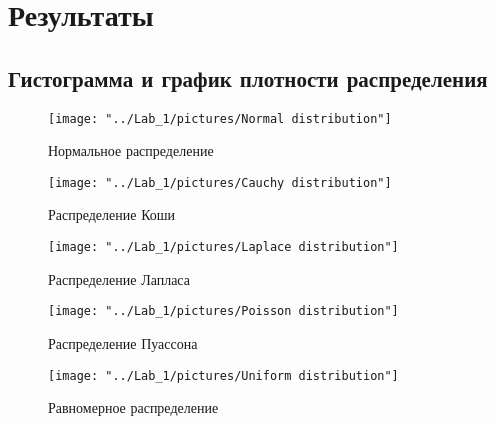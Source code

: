 \documentclass[12pt,a4paper]{article}
\begin{document}
\section{Результаты}
	\subsection{Гистограмма и график плотности распределения}
		\begin{center}
		\begin{figure}[H]
			\texttt{[image: "../Lab\_1/pictures/Normal distribution"]} 
			\caption[Нормальное распределение]{Нормальное распределение}
		\end{figure}
		
		\begin{figure}[H]
			\texttt{[image: "../Lab\_1/pictures/Cauchy distribution"]}
			\caption[Распределение Коши]{Распределение Коши}
		\end{figure}
		
		\begin{figure}[H]
			\texttt{[image: "../Lab\_1/pictures/Laplace distribution"]}
			\caption[Распределение Лапласа]{Распределение Лапласа}
		\end{figure}
		
		\begin{figure}[H]
			\texttt{[image: "../Lab\_1/pictures/Poisson distribution"]}
			\caption[Распределение Пуассона]{Распределение Пуассона}
		\end{figure}
	
		\begin{figure}[H]
			\texttt{[image: "../Lab\_1/pictures/Uniform distribution"]}
			\caption[Равномерное распределение]{Равномерное распределение}
		\end{figure}
		\end{center}
	
\end{document}
